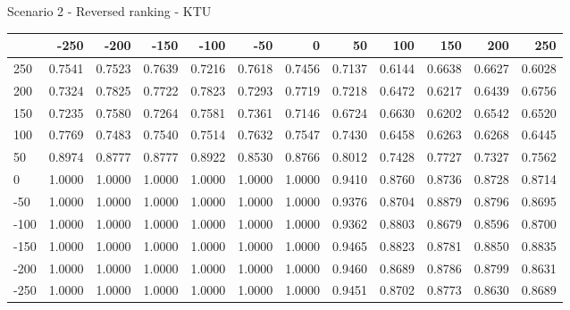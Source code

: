 Scenario 2 - Reversed ranking - KTU
\begin{tabular}{lrrrrrrrrrrr}
\toprule
{} &   -250 &   -200 &   -150 &   -100 &   -50  &    0   &    50  &    100 &    150 &    200 &    250 \\
\midrule
 250 & 0.7541 & 0.7523 & 0.7639 & 0.7216 & 0.7618 & 0.7456 & 0.7137 & 0.6144 & 0.6638 & 0.6627 & 0.6028 \\
 200 & 0.7324 & 0.7825 & 0.7722 & 0.7823 & 0.7293 & 0.7719 & 0.7218 & 0.6472 & 0.6217 & 0.6439 & 0.6756 \\
 150 & 0.7235 & 0.7580 & 0.7264 & 0.7581 & 0.7361 & 0.7146 & 0.6724 & 0.6630 & 0.6202 & 0.6542 & 0.6520 \\
 100 & 0.7769 & 0.7483 & 0.7540 & 0.7514 & 0.7632 & 0.7547 & 0.7430 & 0.6458 & 0.6263 & 0.6268 & 0.6445 \\
 50  & 0.8974 & 0.8777 & 0.8777 & 0.8922 & 0.8530 & 0.8766 & 0.8012 & 0.7428 & 0.7727 & 0.7327 & 0.7562 \\
 0   & 1.0000 & 1.0000 & 1.0000 & 1.0000 & 1.0000 & 1.0000 & 0.9410 & 0.8760 & 0.8736 & 0.8728 & 0.8714 \\
-50  & 1.0000 & 1.0000 & 1.0000 & 1.0000 & 1.0000 & 1.0000 & 0.9376 & 0.8704 & 0.8879 & 0.8796 & 0.8695 \\
-100 & 1.0000 & 1.0000 & 1.0000 & 1.0000 & 1.0000 & 1.0000 & 0.9362 & 0.8803 & 0.8679 & 0.8596 & 0.8700 \\
-150 & 1.0000 & 1.0000 & 1.0000 & 1.0000 & 1.0000 & 1.0000 & 0.9465 & 0.8823 & 0.8781 & 0.8850 & 0.8835 \\
-200 & 1.0000 & 1.0000 & 1.0000 & 1.0000 & 1.0000 & 1.0000 & 0.9460 & 0.8689 & 0.8786 & 0.8799 & 0.8631 \\
-250 & 1.0000 & 1.0000 & 1.0000 & 1.0000 & 1.0000 & 1.0000 & 0.9451 & 0.8702 & 0.8773 & 0.8630 & 0.8689 \\
\bottomrule
\end{tabular}

